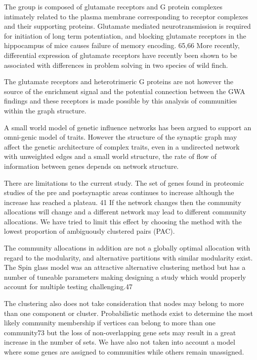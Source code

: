 The group is composed of glutamate receptors and G protein complexes intimately related to the plasma membrane corresponding to receptor complexes and their supporting proteins. Glutamate mediated neurotransmission is required for initiation of long term potentiation, and blocking glutamate receptors in the hippocampus of mice causes failure of memory encoding. 65,66  More recently, differential expression of glutamate receptors have recently been shown to be associated with differences in problem solving in two species of wild finch. \cite{audet2018divergence}  

The glutamate receptors and heterotrimeric G proteins are not however the source of the enrichment signal and the potential connection between the GWA findings and these receptors is made possible by this analysis of communities within the graph structure.

A small world model of genetic influence networks has been argued to support an omni-genic model of traits. \cite{boyle2017expanded}  However the structure of the synaptic graph may affect the genetic architecture of complex traits, even in a undirected network with unweighted edges and a small world structure, the rate of flow of information between genes depends on network structure.

There are limitations to the current study. The set of genes found in proteomic studies of the pre and postsynaptic areas continues to increase although the \cite{heil2018systems} increase has reached a plateau. 41  If the network changes then the community allocations will change and a different network may lead to different community allocations. We have tried to limit this effect by choosing the method with the lowest proportion of ambiguously clustered pairs (PAC).

The community allocations in addition are not a globally optimal allocation with regard to the modularity, and alternative partitions with similar modularity exist. The Spin glass model was an attractive alternative clustering method but has a number of tuneable parameters making designing a study which would properly account for multiple testing challenging.47 

The clustering also does not take consideration that nodes may belong to more than one component or cluster. Probabilistic methods exist to determine the most likely community membership if vertices can belong to more than one community73 but the loss of non-overlapping gene sets may result in a great increase in the number of sets. We have also not taken into account a model where some genes are assigned to communities while others remain unassigned.

